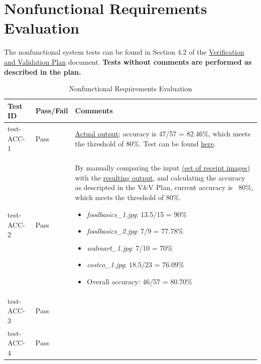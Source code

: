 \documentclass[12pt, titlepage]{article}
\begin{document}
\section{Nonfunctional Requirements Evaluation}

The nonfunctional system tests can be found in Section 4.2 of the
\href{https://github.com/PlutosCapstone/Plutos/blob/main/docs/VnVPlan/VnVPlan.pdf}{Verification
and Validation Plan} document. \textbf{Tests without comments are performed as
described in the plan.}


\begin{longtable}{>{\centering\arraybackslash}p{} >{\centering\arraybackslash}p{} >{\centering\arraybackslash}p{}}
  \caption{Nonfunctional Requirements Evaluation}\\
    \toprule
    \textbf{Test ID} & \textbf{Pass/Fail} & \textbf{Comments} \\
    \midrule
    test-ACC-1 & Pass &
    \href{https://github.com/PlutosCapstone/Plutos/tree/main/src/server/tests/imageProcessing/data/categorization/receipt_items_output.csv}{Actual
    output}; accuracy is 47/57 = 82.46\%, which meets the threshold of 80\%.
    Test can be found
    \href{https://github.com/PlutosCapstone/Plutos/blob/main/src/server/tests/imageProcessing/test_categorization.py}{here}.
    \\
    test-ACC-2 & Pass & By manually comparing the input
    \href{https://github.com/PlutosCapstone/Plutos/tree/main/src/server/tests/imageProcessing/data/parsing/input}{
    (set of receipt images)} with the
    \href{https://github.com/PlutosCapstone/Plutos/tree/main/src/server/tests/imageProcessing/data/parsing/input}{resulting
    output}, and calculating the accuracy as descripted in the V\&V Plan,
    current accuracy is ~80\%, which meets the threshold of 80\%.
    \begin{itemize}
      \item \textit{foodbasics\_1.jpg}: 13.5/15 = 90\%
      \item \textit{foodbasics\_2.jpg}: 7/9 = 77.78\%
      \item \textit{walmart\_1.jpg}: 7/10 = 70\%
      \item \textit{costco\_1.jpg}: 18.5/23 = 76.09\%
      \item Overall accuracy: 46/57 = 80.70\%
    \end{itemize}\\
    test-ACC-3 & Pass &  \\
    test-ACC-4 & Pass &  \\

\end{longtable}
\end{document}
